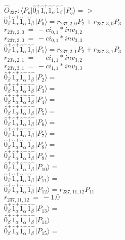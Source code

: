 \documentclass[14pt]{article}
\begin{document}
    $\hat{O}_{237}:  \langle{P_p}\vert \hat{0}_{\beta}^{+}\hat{1}_{\alpha}^{+}\hat{1}_{\alpha}^{-}\hat{1}_{\beta}^{-} \vert{P_q}\rangle => $ \\ 
    $ \hat{0}_{\beta}^{+}\hat{1}_{\alpha}^{+}\hat{1}_{\alpha}^{-}\hat{1}_{\beta}^{-} \vert{P_{0}}\rangle = {r}_{237,2,0}P_{2}+{r}_{237,3,0}P_{3} $ \\ 
    ${r}_{237,2,0}\ =\ -{ci}_{0,1}*{inv}_{3,2} $ \\ 
    ${r}_{237,3,0}\ =\ -{ci}_{0,1}*{inv}_{3,3} $ \\ 
    $ \hat{0}_{\beta}^{+}\hat{1}_{\alpha}^{+}\hat{1}_{\alpha}^{-}\hat{1}_{\beta}^{-} \vert{P_{1}}\rangle = {r}_{237,2,1}P_{2}+{r}_{237,3,1}P_{3} $ \\ 
    ${r}_{237,2,1}\ =\ -{ci}_{1,1}*{inv}_{3,2} $ \\ 
    ${r}_{237,3,1}\ =\ -{ci}_{1,1}*{inv}_{3,3} $ \\ 
    $ \hat{0}_{\beta}^{+}\hat{1}_{\alpha}^{+}\hat{1}_{\alpha}^{-}\hat{1}_{\beta}^{-} \vert{P_{2}}\rangle =  $ \\ 
    $ \hat{0}_{\beta}^{+}\hat{1}_{\alpha}^{+}\hat{1}_{\alpha}^{-}\hat{1}_{\beta}^{-} \vert{P_{3}}\rangle =  $ \\ 
    $ \hat{0}_{\beta}^{+}\hat{1}_{\alpha}^{+}\hat{1}_{\alpha}^{-}\hat{1}_{\beta}^{-} \vert{P_{4}}\rangle =  $ \\ 
    $ \hat{0}_{\beta}^{+}\hat{1}_{\alpha}^{+}\hat{1}_{\alpha}^{-}\hat{1}_{\beta}^{-} \vert{P_{5}}\rangle =  $ \\ 
    $ \hat{0}_{\beta}^{+}\hat{1}_{\alpha}^{+}\hat{1}_{\alpha}^{-}\hat{1}_{\beta}^{-} \vert{P_{6}}\rangle =  $ \\ 
    $ \hat{0}_{\beta}^{+}\hat{1}_{\alpha}^{+}\hat{1}_{\alpha}^{-}\hat{1}_{\beta}^{-} \vert{P_{7}}\rangle =  $ \\ 
    $ \hat{0}_{\beta}^{+}\hat{1}_{\alpha}^{+}\hat{1}_{\alpha}^{-}\hat{1}_{\beta}^{-} \vert{P_{8}}\rangle =  $ \\ 
    $ \hat{0}_{\beta}^{+}\hat{1}_{\alpha}^{+}\hat{1}_{\alpha}^{-}\hat{1}_{\beta}^{-} \vert{P_{9}}\rangle =  $ \\ 
    $ \hat{0}_{\beta}^{+}\hat{1}_{\alpha}^{+}\hat{1}_{\alpha}^{-}\hat{1}_{\beta}^{-} \vert{P_{10}}\rangle =  $ \\ 
    $ \hat{0}_{\beta}^{+}\hat{1}_{\alpha}^{+}\hat{1}_{\alpha}^{-}\hat{1}_{\beta}^{-} \vert{P_{11}}\rangle =  $ \\ 
    $ \hat{0}_{\beta}^{+}\hat{1}_{\alpha}^{+}\hat{1}_{\alpha}^{-}\hat{1}_{\beta}^{-} \vert{P_{12}}\rangle = {r}_{237,11,12}P_{11} $ \\ 
    ${r}_{237,11,12}\ =\ -1.0 $ \\ 
    $ \hat{0}_{\beta}^{+}\hat{1}_{\alpha}^{+}\hat{1}_{\alpha}^{-}\hat{1}_{\beta}^{-} \vert{P_{13}}\rangle =  $ \\ 
    $ \hat{0}_{\beta}^{+}\hat{1}_{\alpha}^{+}\hat{1}_{\alpha}^{-}\hat{1}_{\beta}^{-} \vert{P_{14}}\rangle =  $ \\ 
    $ \hat{0}_{\beta}^{+}\hat{1}_{\alpha}^{+}\hat{1}_{\alpha}^{-}\hat{1}_{\beta}^{-} \vert{P_{15}}\rangle =  $ \\ 
    
\end{document}
